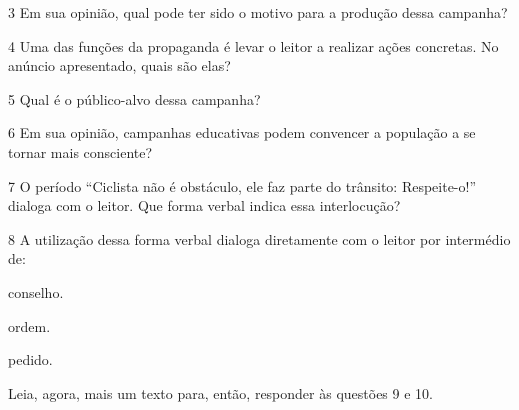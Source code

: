 
\num{3} Em sua opinião, qual pode ter sido o motivo para a produção dessa campanha?


\num{4} Uma das funções da propaganda é levar o leitor a realizar ações
concretas. No anúncio apresentado, quais são elas?


\num{5} Qual é o público-alvo dessa campanha?


\num{6} Em sua opinião, campanhas educativas podem convencer a população a se
tornar mais consciente?


\num{7} O período ``Ciclista não é obstáculo, ele faz parte do trânsito:
Respeite-o!'' dialoga com o leitor. Que forma verbal indica essa
interlocução?



\num{8} A utilização dessa forma verbal dialoga diretamente com o leitor por
intermédio de:

\begin{boxlist}
 conselho.

 ordem.

 pedido.
\end{boxlist}

Leia, agora, mais um texto para, então, responder às questões 9 e 10.


